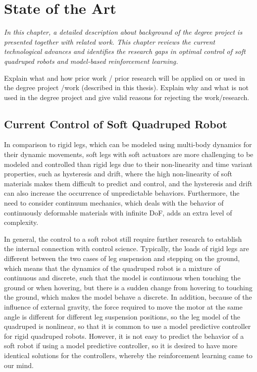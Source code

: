 \chapter{State of the Art}
\textit{In this chapter, a detailed description about background of the degree project is presented together with related work. This chapter reviews the current technological advances and identifies the research gaps in optimal control of soft quadruped robots and model-based reinforcement learning.}

Explain what and how prior work / prior research will be applied on or used in the degree project /work (described in this thesis). Explain why and what is not used in the degree project and give valid reasons for rejecting the work/research.

\section{Current Control of Soft Quadruped Robot}
 In comparison to rigid legs, which can be modeled using multi-body dynamics for their dynamic movements, soft legs with soft actuators are more challenging to be modeled and controlled than rigid legs due to their non-linearity\cite{slotineAppliedNonlinearControl1991} and time variant properties\cite{wangControlStrategiesSoft2022}, such as hysteresis and drift, where the high non-linearity of soft materials makes them difficult to predict and control, and the hysteresis and drift can also increase the occurrence of unpredictable behaviors. Furthermore, the need to consider continuum mechanics, which deals with the behavior of continuously deformable materials with infinite \ac{DoF}\cite{polygerinosSoftRoboticsReview2017}, adds an extra level of complexity. 

In general, the control to a soft robot still require further research to establish the internal connection with control science\cite{wangControlStrategiesSoft2022}. Typically, the loads of rigid legs are different between the two cases of leg suspension and stepping on the ground\cite{biswalDevelopmentQuadrupedWalking2021}, which means that the dynamics of the quadruped robot is a mixture of continuous and discrete, such that the model is continuous when touching the ground or when hovering, but there is a sudden change from hovering to touching the ground, which makes the model behave a discrete. In addition, because of the influence of external gravity, the force required to move the motor at the same angle is different for different leg suspension positions, so the leg model of the quadruped is nonlinear, so that it is common to use a model predictive controller for rigid quadruped robots. However, it is not easy to predict the behavior of a soft robot if using a model predictive controller\cite{BemporadLinearTimevaryingNonlinearMPC}, so it is desired to have more identical solutions for the controllers, whereby the  reinforcement learning came to our mind\cite{hewingLearningbasedModelPredictive2020}. 

